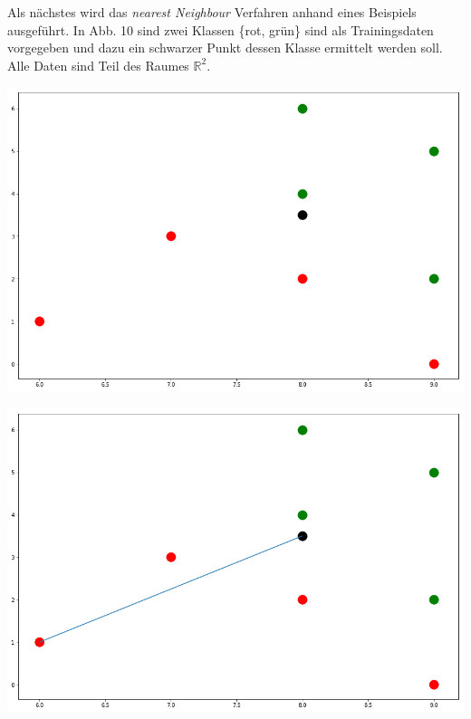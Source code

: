 \documentclass[fontsize=11pt]{scrartcl}
\newenvironment{Figure}
  {\par\medskip\noindent\minipage{\linewidth}}
  {\endminipage\par\medskip}
\begin{document}
				Als nächstes wird das \emph{nearest Neighbour} Verfahren anhand eines Beispiels ausgeführt.
				In Abb. 10 sind zwei Klassen \{rot, grün\} sind als Trainingsdaten vorgegeben und dazu ein schwarzer Punkt dessen Klasse ermittelt werden soll. Alle Daten sind Teil des Raumes $\mathbb{R}^2$.\par
                \begin{Figure}
                    \begin{minipage}[b]{.4\linewidth}
                        \includegraphics[width=\linewidth]{nn1.png}
                    \end{minipage}
                    \hspace*{.1\linewidth}
                    \begin{minipage}[b]{.4\linewidth}
                        \includegraphics[width=\linewidth]{nn2.png}
                    \end{minipage}
                \end{Figure}
\end{document}

